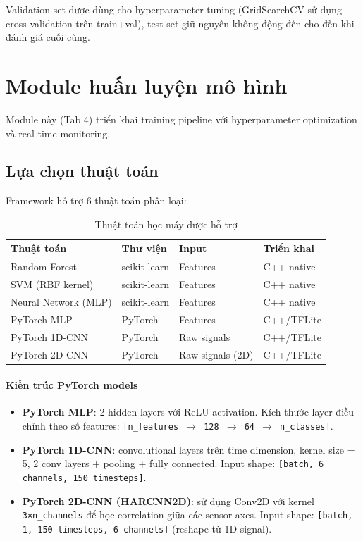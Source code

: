 Validation set được dùng cho hyperparameter tuning (GridSearchCV sử dụng cross-validation trên train+val), test set giữ nguyên không động đến cho đến khi đánh giá cuối cùng.

\section{Module huấn luyện mô hình}
\label{sec:training_module}

Module này (Tab 4) triển khai training pipeline với hyperparameter optimization và real-time monitoring.

\subsection{Lựa chọn thuật toán}
\label{subsec:algorithm_selection}

Framework hỗ trợ 6 thuật toán phân loại:

\begin{table}[H]
\centering
\caption{Thuật toán học máy được hỗ trợ}
\label{tab:algorithms}
\begin{tabular}{@{}llll@{}}
\toprule
\textbf{Thuật toán} & \textbf{Thư viện} & \textbf{Input} & \textbf{Triển khai} \\ \midrule
Random Forest & scikit-learn & Features & C++ native \\
SVM (RBF kernel) & scikit-learn & Features & C++ native \\
Neural Network (MLP) & scikit-learn & Features & C++ native \\
PyTorch MLP & PyTorch & Features & C++/TFLite \\
PyTorch 1D-CNN & PyTorch & Raw signals & C++/TFLite \\
PyTorch 2D-CNN & PyTorch & Raw signals (2D) & C++/TFLite \\ \bottomrule
\end{tabular}
\end{table}

\paragraph{Kiến trúc PyTorch models}
\begin{itemize}
    \item \textbf{PyTorch MLP}: 2 hidden layers với ReLU activation. Kích thước layer điều chỉnh theo số features: \texttt{[n\_features $\rightarrow$ 128 $\rightarrow$ 64 $\rightarrow$ n\_classes]}.
    \item \textbf{PyTorch 1D-CNN}: convolutional layers trên time dimension, kernel size = 5, 2 conv layers + pooling + fully connected. Input shape: \texttt{[batch, 6 channels, 150 timesteps]}.
    \item \textbf{PyTorch 2D-CNN (HARCNN2D)}: sử dụng Conv2D với kernel \texttt{3×n\_channels} để học correlation giữa các sensor axes. Input shape: \texttt{[batch, 1, 150 timesteps, 6 channels]} (reshape từ 1D signal).
\end{itemize}

